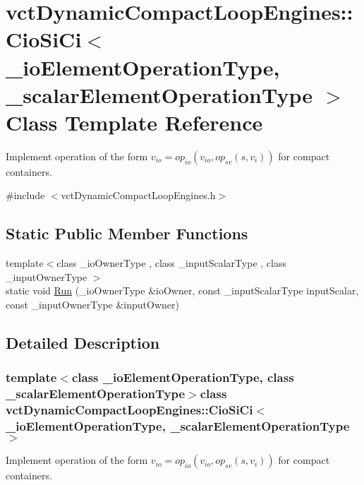 \hypertarget{classvct_dynamic_compact_loop_engines_1_1_cio_si_ci}{\section{vct\-Dynamic\-Compact\-Loop\-Engines\-:\-:Cio\-Si\-Ci$<$ \-\_\-io\-Element\-Operation\-Type, \-\_\-scalar\-Element\-Operation\-Type $>$ Class Template Reference}
\label{classvct_dynamic_compact_loop_engines_1_1_cio_si_ci}
}


Implement operation of the form $v_{io} = op_{io}(v_{io}, op_{sv}(s, v_i))$ for compact containers.  




{\ttfamily \#include $<$vct\-Dynamic\-Compact\-Loop\-Engines.\-h$>$}

\subsection*{Static Public Member Functions}
\begin{DoxyCompactItemize}
\item 
{\footnotesize template$<$class \-\_\-io\-Owner\-Type , class \-\_\-input\-Scalar\-Type , class \-\_\-input\-Owner\-Type $>$ }\\static void \hyperlink{classvct_dynamic_compact_loop_engines_1_1_cio_si_ci_a79209528dbb519c9b8454286bb76f774}{Run} (\-\_\-io\-Owner\-Type \&io\-Owner, const \-\_\-input\-Scalar\-Type input\-Scalar, const \-\_\-input\-Owner\-Type \&input\-Owner)
\end{DoxyCompactItemize}


\subsection{Detailed Description}
\subsubsection*{template$<$class \-\_\-io\-Element\-Operation\-Type, class \-\_\-scalar\-Element\-Operation\-Type$>$class vct\-Dynamic\-Compact\-Loop\-Engines\-::\-Cio\-Si\-Ci$<$ \-\_\-io\-Element\-Operation\-Type, \-\_\-scalar\-Element\-Operation\-Type $>$}

Implement operation of the form $v_{io} = op_{io}(v_{io}, op_{sv}(s, v_i))$ for compact containers. 

